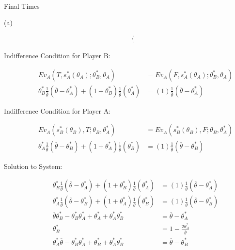 \documentclass[8pt]{extarticle}
\begin{document}
\begin{problem}{Final Times}
\begin{problem}{(a)}
\begin{description}
\begin{align*}
\begin{cases}
              \end{cases}
          \end{align*}
        \item[Indifference Condition for Player B:]
          \begin{align*}
            Ev_A(T,s_{A}^{\ast}(\theta_A);\theta_B^{\ast},\theta_A) &= Ev_A(F,s_{A}^{\ast}(\theta_A);\theta_B^{\ast},\theta_A)\\
            \theta_B^{\ast}\frac{1}{ \overline{\theta} }( \overline{\theta}-\theta_A^{\ast}) + (1+\theta_B^{\ast})\frac{1}{ \overline{\theta} }(\theta_A^{\ast}) &= (1) \frac{1}{ \overline{\theta} }( \overline{\theta}-\theta_A^{\ast})
          \end{align*}
        \item[Indifference Condition for Player A:]
          \begin{align*}
            Ev_A(s_{B}^{\ast}(\theta_{B}),T;\theta_B,\theta_A^{\ast}) &= Ev_A(s_{B}^{\ast}(\theta_{B}),F;\theta_B,\theta_A^{\ast})\\
            \theta_{A}^{\ast}\frac{1}{ \overline{\theta} }( \overline{\theta}-\theta_{B}^{\ast}) + (1+\theta_A^{\ast})\frac{1}{ \overline{\theta}}(\theta_B^{\ast}) &= (1)\frac{1}{\overline{\theta}}(\overline{\theta}-\theta_B^{\ast})
          \end{align*}
        \item[Solution to System:]
          \begin{align*}
            \theta_B^{\ast}\frac{1}{ \overline{\theta} }( \overline{\theta}-\theta_A^{\ast}) + (1+\theta_B^{\ast})\frac{1}{ \overline{\theta} }(\theta_A^{\ast}) &= (1) \frac{1}{ \overline{\theta} }( \overline{\theta}-\theta_A^{\ast}) \tag*{Player A Indifference Condition}\\
            \theta_{A}^{\ast}\frac{1}{ \overline{\theta} }( \overline{\theta}-\theta_{B}^{\ast}) + (1+\theta_A^{\ast})\frac{1}{ \overline{\theta}}(\theta_B^{\ast}) &= (1)\frac{1}{\overline{\theta}}(\overline{\theta}-\theta_B^{\ast})\tag*{Player B Indifference Condition}\\
            \overline{\theta}\theta_B^{\ast} - \theta_{B}^{\ast}\theta_{A}^{\ast} + \theta_{A}^{\ast} + \theta_{A}^{\ast}\theta_{B}^{\ast} &= \overline{\theta} - \theta_{A}^{\ast}\\
            \theta_{B}^{\ast} &= 1-\frac{2\theta_{A}^{\ast}}{ \overline{\theta} }\\
            \theta_{A}^{\ast}\overline{\theta} - \theta_{B}^{\ast}\theta_{A}^{\ast} + \theta_{B}^{\ast} + \theta_{A}^{\ast}\theta_{B}^{\ast} &= \overline{\theta} - \theta_{B}^{\ast}\\

\end{align*}
\end{description}
\end{problem}
\end{problem}
\end{document}
